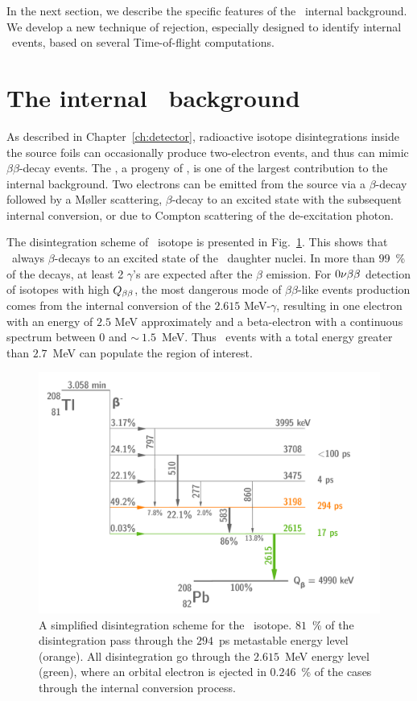 In the next section, we describe the specific features of the \Tl\ internal background.
We develop a new technique of rejection, especially designed to identify internal \Tl\ events, based on several Time-of-flight computations.

\section{The internal \Tl\ background}

As described in Chapter~\ref{ch:detector}, radioactive isotope disintegrations inside the source foils can occasionally produce two-electron events, and thus can mimic $\beta\beta$-decay events.
The \Tl, a progeny of \Th, is one of the largest contribution to the internal background.
Two electrons can be emitted from the source via a $\beta$-decay followed by a M\o{}ller scattering, $\beta$-decay to an excited state with the subsequent internal conversion, or due to Compton scattering of the de-excitation photon.

The disintegration scheme of \Tl\ isotope is presented in Fig.~\ref{fig:Tl_scheme}.
This shows that \Tl\ always $\beta$-decays to an excited state of the \Pb\ daughter nuclei.
In more than $99$~\% of the decays, at least 2 $\gamma$'s are expected after the $\beta$ emission.
For $0\nu\beta\beta$ detection of isotopes with high $Q_{\beta\beta}$, the most dangerous mode of $\beta\beta$-like events production comes from the internal conversion of the $2.615$ MeV-$\gamma$, resulting in one electron with an energy of $2.5$ MeV approximately and a beta-electron with a continuous spectrum between $0$ and $\sim~1.5$~MeV.
Thus \Tl\ events with a total energy greater than $2.7$~MeV can populate the region of interest.
\begin{figure}[!h]
  \centering
  \includegraphics[width=13cm]{timedifference/fig_timediff/Tl_decay_scheme.pdf}
  \caption{A simplified disintegration scheme for the \Tl\ isotope.
    $81$~\% of the disintegration pass through the $294$~ps metastable energy level (orange).
    All disintegration go through the $2.615$~MeV energy level (green), where an orbital electron is ejected in $0.246$~\% of the cases through the internal conversion process.
  \label{fig:Tl_scheme}}
\end{figure}

